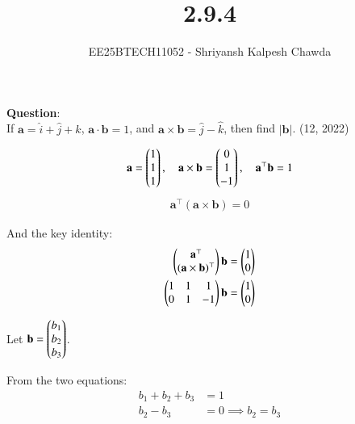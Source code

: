 \documentclass[journal]{IEEEtran}
\begin{document}
	
	
	\vspace{3cm}
	
	\title{2.9.4}
	\author{EE25BTECH11052 - Shriyansh Kalpesh Chawda}
	
	{\let\newpage\relax\maketitle}
	
	\renewcommand{\thefigure}{\theenumi}
	\renewcommand{\thetable}{\theenumi}
	\setlength{\intextsep}{10pt} 
	
	\renewcommand{\thetable}{\theenumi}
	
	\textbf{Question}:\\
	If $\mathbf{a} = \hat{i} + \hat{j} + \hat{k}$, $\mathbf{a} \cdot \mathbf{b} = 1$, and $\mathbf{a} \times \mathbf{b} = \hat{j} - \hat{k}$, then find $|\mathbf{b}|$.
	\hfill{(12, 2022)}
	
	\solution	
	\begin{align}
		\mathbf{a} = \begin{pmatrix}1\\1\\1\end{pmatrix}, \quad \mathbf{a} \times \mathbf{b} = \begin{pmatrix}0\\1\\-1\end{pmatrix}, \quad \mathbf{a}^\top\mathbf{b} = 1
	\end{align}
	\begin{align}
		\mathbf{a}^\top(\mathbf{a} \times \mathbf{b}) = 0
	\end{align}
	
	And the key identity:
	\begin{align}
		\begin{pmatrix}\mathbf{a}^\top \\ (\mathbf{a} \times \mathbf{b})^\top\end{pmatrix}\mathbf{b} = \begin{pmatrix}1\\0\end{pmatrix}\\
		\begin{pmatrix}1 & 1 & 1\\0 & 1 & -1\end{pmatrix}\mathbf{b} = \begin{pmatrix}1\\0\end{pmatrix}
	\end{align}
	
	Let $\mathbf{b} = \begin{pmatrix}b_1\\b_2\\b_3\end{pmatrix}$.
	
	From the two equations:
	\begin{align}
		b_1 + b_2 + b_3 &= 1\\
		b_2 - b_3 &= 0 \implies b_2 = b_3
	\end{align}
	
\end{document}
